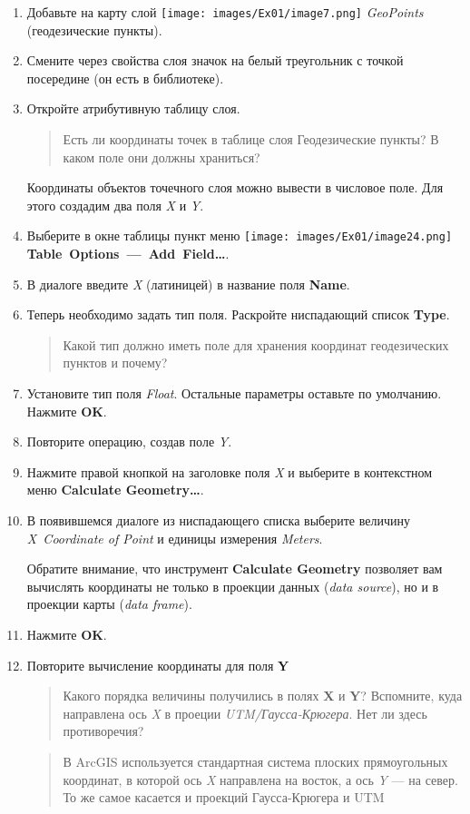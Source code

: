\documentclass[12pt,]{book}
\begin{document}
\begin{enumerate}
\def\labelenumi{\arabic{enumi}.}
\item
  Добавьте на карту слой
  \texttt{[image: images/Ex01/image7.png]} \emph{GeoPoints} (геодезические пункты).
\item
  Смените через свойства слоя значок на белый треугольник с точкой посередине (он есть в библиотеке).
\item
  Откройте атрибутивную таблицу слоя.

  \begin{quote}
  Есть ли координаты точек в таблице слоя Геодезические пункты? В каком поле они должны храниться?
  \end{quote}

  Координаты объектов точечного слоя можно вывести в числовое поле. Для этого создадим два поля \emph{X} и \emph{Y}.
\item
  Выберите в окне таблицы пункт меню \texttt{[image: images/Ex01/image24.png]} \textbf{Table~Options~---~Add~Field\ldots{}}.
\item
  В диалоге введите \emph{X} (латиницей) в название поля \textbf{Name}.
\item
  Теперь необходимо задать тип поля. Раскройте ниспадающий список \textbf{Type}.

  \begin{quote}
  Какой тип должно иметь поле для хранения координат геодезических пунктов и почему?
  \end{quote}
\item
  Установите тип поля \emph{Float}. Остальные параметры оставьте по умолчанию. Нажмите \textbf{OK}.
\item
  Повторите операцию, создав поле \emph{Y}.
\item
  Нажмите правой кнопкой на заголовке поля \emph{X} и выберите в контекстном меню \textbf{Calculate Geometry\ldots{}}.
\item
  В появившемся диалоге из ниспадающего списка выберите величину \emph{X~Coordinate of Point} и единицы измерения \emph{Meters}.

  Обратите внимание, что инструмент \textbf{Calculate Geometry} позволяет вам вычислять координаты не только в проекции данных (\emph{data source}), но и в проекции карты (\emph{data frame}).
\item
  Нажмите \textbf{OK}.
\item
  Повторите вычисление координаты для поля \textbf{Y}

  \begin{quote}
  Какого порядка величины получились в полях \textbf{X} и \textbf{Y}? Вспомните, куда направлена ось \emph{X} в проеции \emph{UTM/Гаусса-Крюгера}. Нет ли здесь противоречия?
  \end{quote}

  \begin{quote}
  В ArcGIS используется стандартная система плоских прямоугольных координат, в которой ось \emph{X} направлена на восток, а ось \emph{Y} --- на север. То же самое касается и проекций Гаусса-Крюгера и UTM
  \end{quote}
\end{enumerate}
\end{document}
